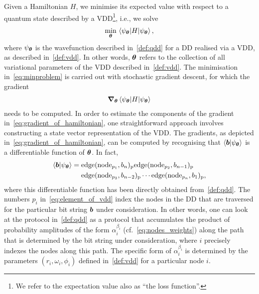 \documentclass{ieeeaccess}
\begin{document}
Given a Hamiltonian $H$, we minimise its expected value with respect to a quantum state described by a VDD\footnote{We refer to the expectation value also as ``the loss function''.}, i.e., we solve
\begin{align}
    \min_{\vb*{\theta}} \expval{H}{\psi_{\vb*{\theta}}},\label{eq:minproblem}
\end{align}
where $\psi_{\vb*{\theta}}$ is the wavefunction described in~\cref{def:qdd} for a DD realised via a VDD, as described in~\cref{def:vdd}.
In other words, $\vb*{\theta}$ refers to the collection of all variational parameters of the VDD described in~\cref{def:vdd}.
The minimisation in~\cref{eq:minproblem} is carried out with stochastic gradient descent, for which the gradient
\begin{align}
    \grad_{\vb*{\theta}} \expval{H}{\psi_{\vb*{\theta}}} \label{eq:gradient_of_hamiltonian}
\end{align}
needs to be computed.
In order to estimate the components of the gradient in~\cref{eq:gradient_of_hamiltonian}, one straightforward approach involves constructing a state vector representation of the VDD.
The gradients, as depicted in~\cref{eq:gradient_of_hamiltonian}, can be computed by recognising that $\braket{\vb*{b}}{\psi_{\vb*{\theta}}}$ is a differentiable function of $\vb*{\theta}$. In fact,
\begin{align}
\begin{aligned}
    \braket{\vb*{b}}{\psi_{\vb*{\theta}}} ={}& \text{edge}(\text{node}_{p_1}, b_n)_\text{p} \text{edge}(\text{node}_{p_2}, b_{n-1})_\text{p}\\
    &\text{edge}(\text{node}_{p_3}, b_{n-2})_\text{p}\cdots\text{edge}(\text{node}_{p_n}, b_1)_\text{p},
\end{aligned}\label{eq:element_of_vdd}
\end{align}
where this differentiable function has been directly obtained from~\cref{def:qdd}. The numbers $p_i$ in~\cref{eq:element_of_vdd} index the nodes in the DD that are traversed for the particular bit string $\vb*{b}$ under consideration.
In other words, one can look at the protocol in~\cref{def:qdd} as a protocol that accumulates the product of probability amplitudes of the form $\alpha_i^{\beta_i}$ (cf.~\cref{eq:nodes_weights}) along the path that is determined by the bit string under consideration, where $i$ precisely indexes the nodes along this path.
The specific form of $\alpha_i^{\beta_i}$ is determined by the parameters $(r_i,\omega_i,\phi_i)$ defined in~\cref{def:vdd} for a particular node $i$.
\end{document}
